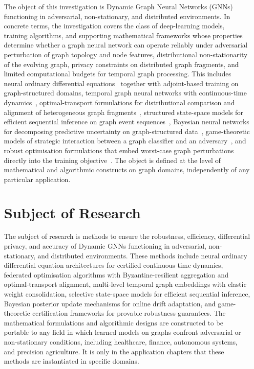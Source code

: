The object of this investigation is Dynamic Graph Neural Networks (GNNs) functioning in adversarial, non-stationary, and distributed environments. In concrete terms, the investigation covers the class of deep-learning models, training algorithms, and supporting mathematical frameworks whose properties determine whether a graph neural network can operate reliably under adversarial perturbation of graph topology and node features, distributional non-stationarity of the evolving graph, privacy constraints on distributed graph fragments, and limited computational budgets for temporal graph processing. This includes neural ordinary differential equations~\cite{Chen2018,Pontryagin1962} together with adjoint-based training on graph-structured domains, temporal graph neural networks with continuous-time dynamics~\cite{Xu2020tgat,Rossi2020,Chamberlain2021}, optimal-transport formulations for distributional comparison and alignment of heterogeneous graph fragments~\cite{Villani2009,Peyre2019}, structured state-space models for efficient sequential inference on graph event sequences~\cite{Gu2022,Dao2024,Behrouz2024graphmamba}, Bayesian neural networks for decomposing predictive uncertainty on graph-structured data~\cite{Blundell2015,Lakshminarayanan2017}, game-theoretic models of strategic interaction between a graph classifier and an adversary~\cite{Tambe2011,Sinha2018}, and robust optimisation formulations that embed worst-case graph perturbations directly into the training objective~\cite{Madry2018,Zhang2019trades}. The object is defined at the level of mathematical and algorithmic constructs on graph domains, independently of any particular application.


\section*{Subject of Research}

The subject of research is methods to ensure the robustness, efficiency, differential privacy, and accuracy of Dynamic GNNs functioning in adversarial, non-stationary, and distributed environments. These methods include neural ordinary differential equation architectures for certified continuous-time dynamics, federated optimisation algorithms with Byzantine-resilient aggregation and optimal-transport alignment, multi-level temporal graph embeddings with elastic weight consolidation, selective state-space models for efficient sequential inference, Bayesian posterior update mechanisms for online drift adaptation, and game-theoretic certification frameworks for provable robustness guarantees. The mathematical formulations and algorithmic designs are constructed to be portable to any field in which learned models on graphs confront adversarial or non-stationary conditions, including healthcare, finance, autonomous systems, and precision agriculture. It is only in the application chapters that these methods are instantiated in specific domains.


